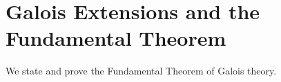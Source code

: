 \section{Galois Extensions and the Fundamental Theorem}
\label{sec:galois-fundamental-theorem}

We state and prove the Fundamental Theorem of Galois theory.
